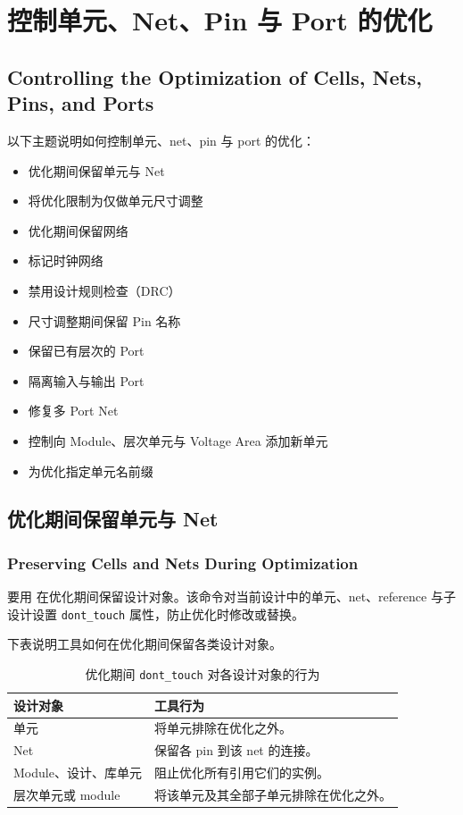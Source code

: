 \section{控制单元、Net、Pin 与 Port 的优化}
\subsection*{Controlling the Optimization of Cells, Nets, Pins, and Ports}

以下主题说明如何控制单元、net、pin 与 port 的优化：
\begin{itemize}
  \item 优化期间保留单元与 Net
  \item 将优化限制为仅做单元尺寸调整
  \item 优化期间保留网络
  \item 标记时钟网络
  \item 禁用设计规则检查（DRC）
  \item 尺寸调整期间保留 Pin 名称
  \item 保留已有层次的 Port
  \item 隔离输入与输出 Port
  \item 修复多 Port Net
  \item 控制向 Module、层次单元与 Voltage Area 添加新单元
  \item 为优化指定单元名前缀
\end{itemize}

\subsection{优化期间保留单元与 Net}
\subsubsection*{Preserving Cells and Nets During Optimization}

要用  在优化期间保留设计对象。该命令对当前设计中的单元、net、reference 与子设计设置 \texttt{dont\_touch} 属性，防止优化时修改或替换。

下表说明工具如何在优化期间保留各类设计对象。

\begin{table}[htbp]
\centering
\caption{优化期间 \texttt{dont\_touch} 对各设计对象的行为}
\begin{tabularx}{\textwidth}{@{}l X@{}}
\toprule
\textbf{设计对象} & \textbf{工具行为} \\
\midrule
单元 & 将单元排除在优化之外。 \\
Net & 保留各 pin 到该 net 的连接。 \\
Module、设计、库单元 & 阻止优化所有引用它们的实例。 \\
层次单元或 module & 将该单元及其全部子单元排除在优化之外。 \\
\bottomrule
\end{tabularx}
\end{table}

